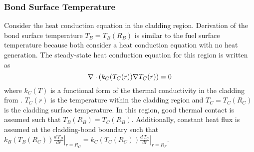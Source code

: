     \subsubsection{Bond Surface Temperature}
      Consider the heat conduction equation in the cladding region. Derivation
      of the bond surface temperature $T_B=T_B(R_B)$ is similar to
      the fuel surface temperature because both consider a heat conduction
      equation with no heat generation. The steady-state heat conduction 
      equation for this region is written as
      \begin{equation}
        \label{eq:clad_conduction_grad}
        \mathbf{\nabla} \cdot (k_C(T_C(r)) \mathbf{\nabla} T_C(r)) = 0
      \end{equation}
      where $k_C(T)$ is a functional form of the thermal conductivity in the
      cladding from \cite{ht9Prop}. $T_C(r)$ is the temperature within the
      cladding region and $T_C=T_C(R_C)$ is the cladding surface temperature. 
      In this region, good thermal contact is assumed such that
      $T_B(R_B)=T_C(R_B)$. Additionally, constant heat flux is assumed at the
      cladding-bond boundary such that $\left. k_B(T_B(R_C))
      \frac{d\,T_B}{dr}\right|_{r=R_C} = \left. k_C(T_C(R_C))
      \frac{d\,T_C}{dr}\right|_{r=R_F}$.

